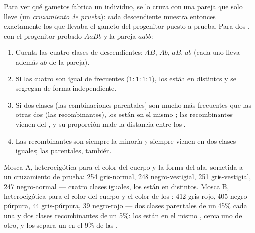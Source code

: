 \begin{method}\label{met:g12:meiosis-genetic-shuffling:testcross}
Para ver qué gametos fabrica un individuo, se lo cruza con una pareja
que solo lleve   (un \emph{cruzamiento de prueba}): cada
descendiente muestra entonces exactamente los  que llevaba el
gameto del progenitor puesto a prueba. Para dos , con el
progenitor probado $AaBb$ y la pareja $aabb$:
\begin{enumerate}
  \item Cuenta las cuatro clases de descendientes: $AB$, $Ab$, $aB$,
        $ab$ (cada uno lleva además $ab$ de la pareja).
  \item Si las cuatro son igual de frecuentes ($1:1:1:1$), los 
        están en  distintos y se segregan de forma
        independiente.
  \item Si dos clases (las combinaciones parentales) son mucho más
        frecuentes que las otras dos (las recombinantes), los 
        están en el mismo ; las recombinantes vienen del
        , y su proporción mide la distancia entre los
        .
  \item Las recombinantes son siempre la minoría y siempre vienen en
        dos clases iguales; las parentales, también.
\end{enumerate}
\end{method}

\begin{example}\label{ex:g12:meiosis-genetic-shuffling:fly}
Mosca A, heterocigótica para el color del cuerpo y la forma del ala,
sometida a un cruzamiento de prueba: 254 gris-normal, 248
negro-vestigial, 251 gris-vestigial, 247 negro-normal --- cuatro clases
iguales, los  están en  distintos. Mosca B,
heterocigótica para el color del cuerpo y el color de los : 412
gris-rojo, 405 negro-púrpura, 44 gris-púrpura, 39 negro-rojo --- dos
clases parentales de un 45\% cada una y dos clases recombinantes de un
5\%: los  están en el mismo , cerca uno de otro, y los
separa un  en el 9\% de las .
\end{example}

